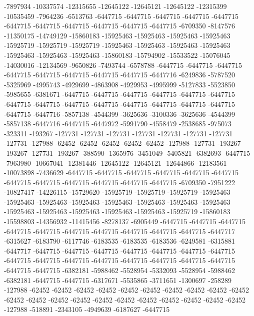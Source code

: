 -7897934 -10337574 -12315655 -12645122 -12645121 -12645122 -12315399 -10535459 -7964236 -6513763 -6447715 -6447715 -6447715 -6447715 -6447715 -6447715 -6447715 -6447715 -6447715 -6447715 -6447715 -6709350 -8147576 -11350175 -14749129 -15860183 -15925463 -15925463 -15925463 -15925463 -15925719 -15925719 -15925719 -15925463 -15925463 -15925463 -15925463 -15925463 -15925463 -15925463 -15860183 -15794902 -15533522 -15076045 -14030016 -12134569 -9650826 -7493744 -6578788 -6447715 -6447715 -6447715 -6447715 -6447715 -6447715 -6447715 -6447715 -6447716 -6249836 -5787520 -5325969 -4995743 -4929699 -4863908 -4929953 -4995999 -5127833 -5523850 -5985655 -6381671 -6447715 -6447715 -6447715 -6447715 -6447715 -6447715 -6447715 -6447715 -6447715 -6447715 -6447715 -6447715 -6447715 -6447715 -6447715 -6447716 -5857138 -4544399 -3625636 -3100336 -3625636 -4544399 -5857138 -6447716 -6447715 -6447972 -5991790 -4558479 -2538685 -975073 -323311 -193267 -127731 -127731 -127731 -127731 -127731 -127731 -127731 -127731 -127988 -62452 -62452 -62452 -62452 -62452 -127988 -127731 -193267 -193267 -127731 -193267 -388590 -1365976 -3451049 -5405821 -6382693 -6447715
-7963980 -10667041 -12381446 -12645122 -12645121 -12644866 -12183561 -10073898 -7436629 -6447715 -6447715 -6447715 -6447715 -6447715 -6447715 -6447715 -6447715 -6447715 -6447715 -6447715 -6447715 -6709350 -7951222 -10827417 -14226115 -15729620 -15925719 -15925719 -15925719 -15925463 -15925463 -15925463 -15925463 -15925463 -15925463 -15925463 -15925463 -15925463 -15925463 -15925463 -15925463 -15925463 -15925719 -15860183 -15598803 -14356932 -11415456 -8278137 -6905449 -6447715 -6447715 -6447715 -6447715 -6447715 -6447715 -6447715 -6447715 -6447715 -6447715 -6447717 -6315627 -6183790 -6117746 -6183535 -6183535 -6183536 -6249581 -6315881 -6447717 -6447715 -6447715 -6447715 -6447715 -6447715 -6447715 -6447715 -6447715 -6447715 -6447715 -6447715 -6447715 -6447715 -6447715 -6447715 -6447715 -6447715 -6382181 -5988462 -5528954 -5332093 -5528954 -5988462 -6382181 -6447715 -6447715 -6317671 -5535865 -3711651 -1300697 -258289 -127988 -62452 -62452 -62452 -62452 -62452 -62452 -62452 -62452 -62452 -62452 -62452 -62452 -62452 -62452 -62452 -62452 -62452 -62452 -62452 -62452 -62452 -127988 -518891 -2343105 -4949639 -6187627 -6447715
